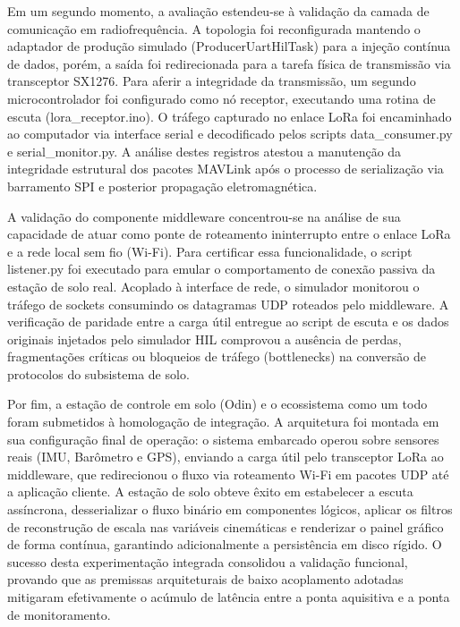 Em um segundo momento, a avaliação estendeu-se à validação da camada de comunicação em radiofrequência. A topologia foi reconfigurada mantendo o adaptador de produção simulado (ProducerUartHilTask) para a injeção contínua de dados, porém, a saída foi redirecionada para a tarefa física de transmissão via transceptor SX1276. Para aferir a integridade da transmissão, um segundo microcontrolador foi configurado como nó receptor, executando uma rotina de escuta (lora\_receptor.ino). O tráfego capturado no enlace LoRa foi encaminhado ao computador via interface serial e decodificado pelos scripts data\_consumer.py e serial\_monitor.py. A análise destes registros atestou a manutenção da integridade estrutural dos pacotes MAVLink após o processo de serialização via barramento SPI e posterior propagação eletromagnética.

A validação do componente middleware concentrou-se na análise de sua capacidade de atuar como ponte de roteamento ininterrupto entre o enlace LoRa e a rede local sem fio (Wi-Fi). Para certificar essa funcionalidade, o script listener.py foi executado para emular o comportamento de conexão passiva da estação de solo real. Acoplado à interface de rede, o simulador monitorou o tráfego de sockets consumindo os datagramas UDP roteados pelo middleware. A verificação de paridade entre a carga útil entregue ao script de escuta e os dados originais injetados pelo simulador HIL comprovou a ausência de perdas, fragmentações críticas ou bloqueios de tráfego (bottlenecks) na conversão de protocolos do subsistema de solo.

Por fim, a estação de controle em solo (Odin) e o ecossistema como um todo foram submetidos à homologação de integração. A arquitetura foi montada em sua configuração final de operação: o sistema embarcado operou sobre sensores reais (IMU, Barômetro e GPS), enviando a carga útil pelo transceptor LoRa ao middleware, que redirecionou o fluxo via roteamento Wi-Fi em pacotes UDP até a aplicação cliente. A estação de solo obteve êxito em estabelecer a escuta assíncrona, desserializar o fluxo binário em componentes lógicos, aplicar os filtros de reconstrução de escala nas variáveis cinemáticas e renderizar o painel gráfico de forma contínua, garantindo adicionalmente a persistência em disco rígido. O sucesso desta experimentação integrada consolidou a validação funcional, provando que as premissas arquiteturais de baixo acoplamento adotadas mitigaram efetivamente o acúmulo de latência entre a ponta aquisitiva e a ponta de monitoramento.


